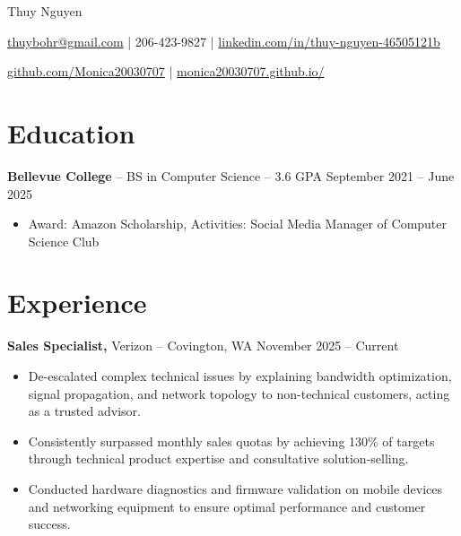 \documentclass[11pt]{article}       %
\begin{document}
\centerline{\Huge Thuy Nguyen}

\vspace{5pt}

\centerline{\href{mailto:thuybohr@gmail.com}{thuybohr@gmail.com} | 206-423-9827 |
\href{https://www.linkedin.com/in/thuy-nguyen-46505121b/}{linkedin.com/in/thuy-nguyen-46505121b}}

\centerline{\href{https://github.com/Monica20030707}{github.com/Monica20030707} | 
\href{https://monica20030707.github.io/}{monica20030707.github.io/}} 

\vspace{-9pt}

\section*{Education}
\textbf{Bellevue College} -- BS in Computer Science -- 3.6 GPA \hfill September 2021 -- June 2025\\
\vspace{-9pt}
\begin{itemize}
  \item Award: Amazon Scholarship, Activities: Social Media Manager of Computer Science Club
\end{itemize}

\vspace{-18.5pt}

\section*{Experience}

\textbf{Sales Specialist,} {Verizon} -- Covington, WA \hfill November 2025 -- Current \\
\vspace{-9pt}
\begin{itemize}
  \item De-escalated complex technical issues by explaining bandwidth optimization, signal propagation, and network topology to non-technical customers, acting as a trusted advisor.
  \item Consistently surpassed monthly sales quotas by achieving 130\% of targets through technical product expertise and consultative solution-selling.
  \item Conducted hardware diagnostics and firmware validation on mobile devices and networking equipment to ensure optimal performance and customer success.
\end{itemize}
\end{document}
